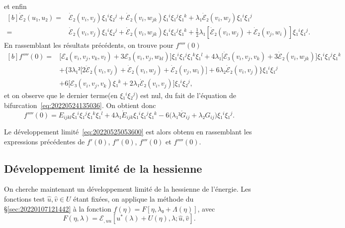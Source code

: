 \documentclass[12pt, final]{scrartcl}
\theoremstyle{definition}
\begin{document}
et enfin
\begin{equation*}
  \begin{aligned}[b]
    \dot{ℰ}₂(u₁, u₂)
    ={} & \dot{ℰ}₂ (v_i, v_j) ξ₁^i ξ₂^j + \dot{ℰ}₂(v_i, w_{j k}) ξ₁^i ξ₁^j ξ₁^k + λ₁ \dot{ℰ}₂(v_i, w_j) ξ₁^i ξ₁^j\\
    ={} & \dot{ℰ}₂(v_i, v_j) ξ₁^i ξ₂^j + \dot{ℰ}₂(v_i, w_{j k}) ξ₁^i ξ₁^j ξ₁^k + \tfrac{1}{2} λ₁ [\dot{ℰ}₂(v_i, w_j) + \dot{ℰ}₂(v_j, w_i)] ξ₁^i ξ₁^j.
  \end{aligned}
\end{equation*}
En rassemblant les résultats précédents, on trouve pour \(f''''(0)\)
\begin{equation*}
  \begin{aligned}[b]
    f''''(0)
    ={} & \bigl[ ℰ₄(v_i, v_j, v_k , v_l) + 3ℰ₃(v_i, v_j, w_{k l}) \bigr] ξ₁^i ξ₁^j ξ₁^k ξ₁^l + 4 λ₁ \bigl[\dot{ℰ}₃(v_i, v_j, v_k) + 3 \dot{ℰ}₂(v_i, w_{j k})\bigr] ξ₁^i ξ₁^j ξ₁^k\\
    & + \bigl\{3 λ₁² \bigl[ 2\ddot{ℰ}₂ (v_i, v_j) + \dot{ℰ}₂(v_i, w_j) + \dot{ℰ}₂(v_j, w_i) \bigr] + 6λ₂ \dot{ℰ}₂(v_i, v_j) \bigr\} ξ₁^i ξ₁^j\\
    & + 6\bigl[ℰ₃(v_i, v_j, v_k) ξ₁^k + 2 λ₁ \dot{ℰ}₂(v_i, v_j)\bigr] ξ₁^i ξ₂^j,
  \end{aligned}
\end{equation*}
et on observe que le dernier terme(en \(ξ₁^i ξ₂^j\)) est nul, du fait de
l'équation de bifurcation~\eqref{eq:20220524135036}. On obtient donc
\begin{equation}
  \label{eq:20220601055512}
  f''''(0) = E_{i j k l} ξ₁^i ξ₁^j ξ₁^k ξ₁^l + 4 λ₁ \mathring{E}_{i j k} ξ₁^i ξ₁^j ξ₁^k - 6 \bigl(λ₁² \mathring{G}_{i j} + λ₂ G_{i j}\bigr) ξ₁^i ξ₁^j .
\end{equation}

Le développement limité~\eqref{eq:20220525053600} est alors obtenu en
rassemblant les expressions précédentes de \(f'(0)\), \(f''(0)\), \(f'''(0)\) et
\(f''''(0)\).

\subsection{Développement limité de la hessienne}
%

On cherche maintenant un développement limité de la hessienne de l'énergie. Les
fonctions test \(\hat{u}, \hat{v} ∈ U\) étant fixées, on applique la méthode du
\S\ref{sec:20220107121442} à la fonction \(f(η) = F [η, λ₀ + Λ(η)]\), avec
\begin{equation*}
  F(η, λ) = ℰ_{, u u} [u^{\ast}(λ) + U(η), λ; \hat{u}, \hat{v}].
\end{equation*}
\end{document}
